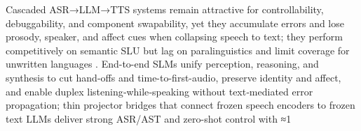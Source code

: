 Cascaded ASR→LLM→TTS systems remain attractive for controllability, debuggability, and component swapability, yet they accumulate errors and lose prosody, speaker, and affect cues when collapsing speech to text; they perform competitively on semantic SLU but lag on paralinguistics and limit coverage for unwritten languages \cite{huang2023holisticcascadesystembenchmarkhumanevalu,huang2025dynamicsuperbphase2collaborativelyexpand}. End-to-end SLMs unify perception, reasoning, and synthesis to cut hand-offs and time-to-first-audio, preserve identity and affect, and enable duplex listening‑while‑speaking without text‑mediated error propagation; thin projector bridges that connect frozen speech encoders to frozen text LLMs deliver strong ASR/AST and zero-shot control with ≈1%

